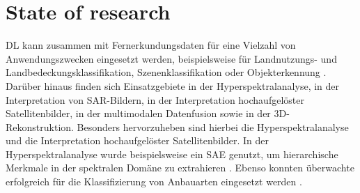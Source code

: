 \chapter{State of research}
\label{ch:state_of_research}












\acrlong{DL} kann zusammen mit Fernerkundungsdaten für eine Vielzahl von Anwendungszwecken eingesetzt werden, beispielsweise für Landnutzungs- und Landbedeckungsklassifikation, Szenenklassifikation oder Objekterkennung \cite{Zhu2017}. Darüber hinaus finden sich Einsatzgebiete in der Hyperspektralanalyse, in der Interpretation von SAR-Bildern, in der Interpretation hochaufgelöster Satellitenbilder, in der multimodalen Datenfusion sowie in der 3D-Rekonstruktion. Besonders hervorzuheben sind hierbei die Hyperspektralanalyse und die Interpretation hochaufgelöster Satellitenbilder. In der Hyperspektralanalyse wurde beispielsweise ein \gls{SAE} genutzt, um hierarchische Merkmale in der spektralen Domäne zu extrahieren \cite{Chen2014}. Ebenso konnten überwachte  erfolgreich für die Klassifizierung von Anbauarten eingesetzt werden \cite{Kussul2017}.

